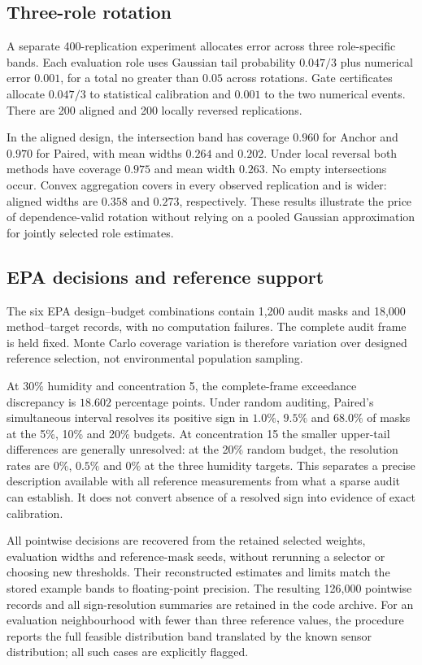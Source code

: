 \subsection{Three-role rotation}
A separate 400-replication experiment allocates error across three role-specific bands. Each evaluation role uses Gaussian tail probability $0.047/3$ plus numerical error $0.001$, for a total no greater than $0.05$ across rotations. Gate certificates allocate $0.047/3$ to statistical calibration and $0.001$ to the two numerical events. There are 200 aligned and 200 locally reversed replications.

In the aligned design, the intersection band has coverage $0.960$ for Anchor and $0.970$ for Paired, with mean widths $0.264$ and $0.202$. Under local reversal both methods have coverage $0.975$ and mean width $0.263$. No empty intersections occur. Convex aggregation covers in every observed replication and is wider: aligned widths are $0.358$ and $0.273$, respectively. These results illustrate the price of dependence-valid rotation without relying on a pooled Gaussian approximation for jointly selected role estimates.

\subsection{EPA decisions and reference support}
The six EPA design--budget combinations contain 1,200 audit masks and 18,000 method--target records, with no computation failures. The complete audit frame is held fixed. Monte Carlo coverage variation is therefore variation over designed reference selection, not environmental population sampling.

At $30\%$ humidity and concentration 5, the complete-frame exceedance discrepancy is $18.602$ percentage points. Under random auditing, Paired's simultaneous interval resolves its positive sign in $1.0\%$, $9.5\%$ and $68.0\%$ of masks at the 5\%, 10\% and 20\% budgets. At concentration 15 the smaller upper-tail differences are generally unresolved: at the 20\% random budget, the resolution rates are $0\%$, $0.5\%$ and $0\%$ at the three humidity targets. This separates a precise description available with all reference measurements from what a sparse audit can establish. It does not convert absence of a resolved sign into evidence of exact calibration.

All pointwise decisions are recovered from the retained selected weights, evaluation widths and reference-mask seeds, without rerunning a selector or choosing new thresholds. Their reconstructed estimates and limits match the stored example bands to floating-point precision. The resulting 126,000 pointwise records and all sign-resolution summaries are retained in the code archive. For an evaluation neighbourhood with fewer than three reference values, the procedure reports the full feasible distribution band translated by the known sensor distribution; all such cases are explicitly flagged.


